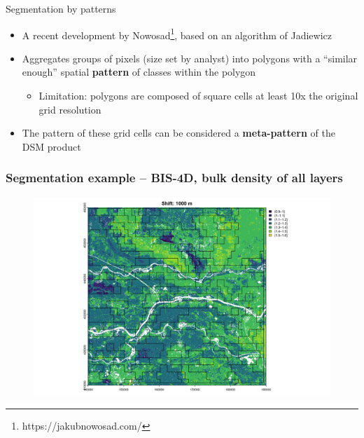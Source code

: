 \documentclass[aspectratio=169, 10pt]{beamer}
\begin{document}
\begin{frame}{Segmentation by patterns}
\begin{itemize}
    \item 
A recent development by Nowosad\footnote{https://jakubnowosad.com/}, based on an algorithm of Jadiewicz    
\item Aggregates groups of pixels (size set by analyst) into polygons with a ``similar enough'' spatial \textbf{pattern} of classes within the polygon
  \begin{itemize}
  \item Limitation: polygons are composed of square cells at least 10x the original grid resolution
  \end{itemize}
\item The pattern of these grid cells can be considered a \textbf{meta-pattern} of the DSM product
\end{itemize}
\end{frame}

\begin{frame}
  \frametitle{Segmentation example -- BIS-4D, bulk density of all layers}
    \begin{figure}
        \centering        \includegraphics[height=0.7\textheight]{graphics_david/all-files-resolutions-3.png}
      \end{figure}
\end{frame}
      
\end{document}

